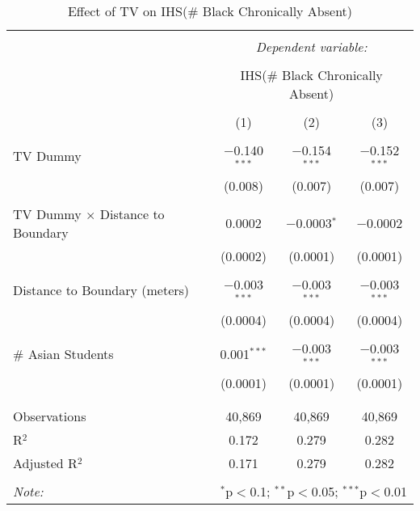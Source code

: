 
\begin{table}[!htbp] \centering 
  \caption{Effect of TV on IHS(\# Black Chronically Absent)} 
  \label{} 
\begin{tabular}{@{\extracolsep{-2pt}}lccc} 
\\[-1.8ex]\hline 
\hline \\[-1.8ex] 
 & \multicolumn{3}{c}{\textit{Dependent variable:}} \\ 
\cline{2-4} 
\\[-1.8ex] & \multicolumn{3}{c}{IHS(\# Black Chronically Absent)} \\ 
\\[-1.8ex] & (1) & (2) & (3)\\ 
\hline \\[-1.8ex] 
 TV Dummy & $-$0.140$^{***}$ & $-$0.154$^{***}$ & $-$0.152$^{***}$ \\ 
  & (0.008) & (0.007) & (0.007) \\ 
  & & & \\ 
 TV Dummy $\times$ Distance to Boundary & 0.0002 & $-$0.0003$^{*}$ & $-$0.0002 \\ 
  & (0.0002) & (0.0001) & (0.0001) \\ 
  & & & \\ 
 Distance to Boundary (meters) & $-$0.003$^{***}$ & $-$0.003$^{***}$ & $-$0.003$^{***}$ \\ 
  & (0.0004) & (0.0004) & (0.0004) \\ 
  & & & \\ 
 \# Asian Students & 0.001$^{***}$ & $-$0.003$^{***}$ & $-$0.003$^{***}$ \\ 
  & (0.0001) & (0.0001) & (0.0001) \\ 
  & & & \\ 
\hline \\[-1.8ex] 
Observations & 40,869 & 40,869 & 40,869 \\ 
R$^{2}$ & 0.172 & 0.279 & 0.282 \\ 
Adjusted R$^{2}$ & 0.171 & 0.279 & 0.282 \\ 
\hline 
\hline \\[-1.8ex] 
\textit{Note:}  & \multicolumn{3}{r}{$^{*}$p$<$0.1; $^{**}$p$<$0.05; $^{***}$p$<$0.01} \\ 
\end{tabular} 
\end{table} 

